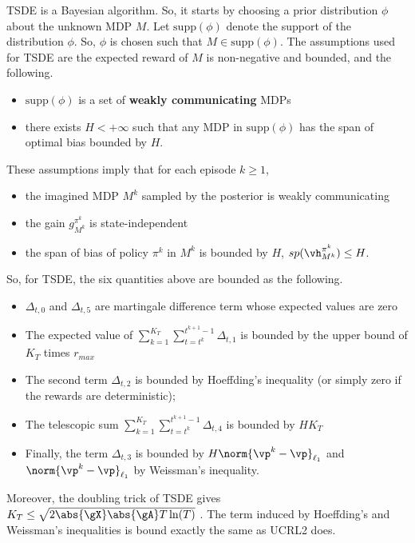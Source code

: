 TSDE is a Bayesian algorithm. So, it starts by choosing a prior distribution $\phi$ about the unknown MDP $M$.
Let $\mathrm{supp}(\phi)$ denote the support of the distribution $\phi$.
So, $\phi$ is chosen such that $M\in\mathrm{supp}(\phi)$.
The assumptions used for TSDE are the expected reward of $M$ is non-negative and bounded, and the following.
\begin{itemize}
    \item $\mathrm{supp}(\phi)$ is a set of \textbf{weakly communicating} MDPs
    \item there exists $H<+\infty$ such that any MDP in $\mathrm{supp}(\phi)$ has the span of optimal bias bounded by $H$.
\end{itemize}
These assumptions imply that for each episode $k\ge1$,
\begin{itemize}
    \item the imagined MDP $M^k$ sampled by the posterior is weakly communicating
    \item the gain $g^{\pi^k}_{M^k}$ is state-independent
    \item the span of bias of policy $\pi^k$ in $M^k$ is bounded by $H$, $sp(\vh^{\pi^k}_{M^k})\le H$.
\end{itemize}
So, for TSDE, the six quantities above are bounded as the following.
\begin{itemize}
    \item $\Delta_{t,0}$ and $\Delta_{t,5}$ are martingale difference term whose expected values are zero
    \item The expected value of $\sum_{k=1}^{K_T}\sum_{t=t^k}^{t^{k+1}-1}\Delta_{t,1}$ is bounded by the upper bound of $K_T$ times $r_{max}$
    \item The second term $\Delta_{t,2}$ is bounded by Hoeffding's inequality (or simply zero if the rewards are deterministic);
    \item The telescopic sum $\sum_{k=1}^{K_T}\sum_{t=t^k}^{t^{k+1}-1} \Delta_{t,4}$ is bounded by $HK_T$
    \item Finally, the term $\Delta_{t,3}$ is bounded by $H\norm{\vp^k-\vp}_{\ell_1}$ and $\norm{\vp^k-\vp}_{\ell_1}$ by Weissman's inequality.
\end{itemize}

Moreover, the doubling trick of TSDE gives $K_T\le \sqrt{2\abs{\gX}\abs{\gA}T\ln(T)}$ \cite[Lemma~1]{ouyang2017learning}.
The term induced by Hoeffding's and Weissman's inequalities is bound exactly the same as UCRL2 does.

